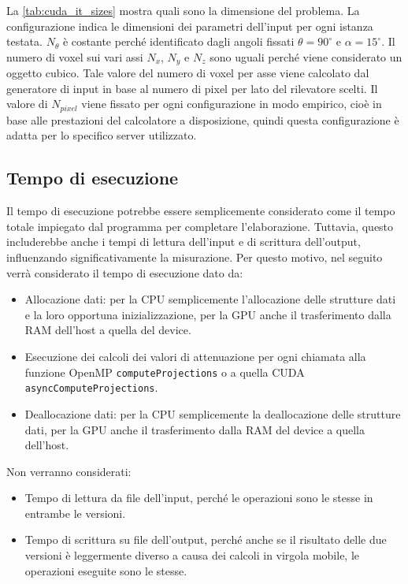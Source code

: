 \documentclass[12pt,a4paper]{report}
\begin{document}
La \autoref{tab:cuda_it_sizes} mostra quali sono la dimensione del problema.
La configurazione indica le dimensioni dei parametri dell'input per ogni istanza testata.
\(N_\theta\) è costante perché identificato dagli angoli fissati \(\theta = 90^\circ\) e \(\alpha = 15^\circ\).
Il numero di voxel sui vari assi \(N_x\), \(N_y\) e \(N_z\) sono uguali perché viene considerato un oggetto cubico.
Tale valore del numero di voxel per asse viene calcolato dal generatore di input in base al numero di pixel per lato del
rilevatore scelti.
Il valore di \(N_{pixel}\) viene fissato per ogni configurazione in modo empirico, cioè in base alle prestazioni del calcolatore
a disposizione, quindi questa configurazione è adatta per lo specifico server utilizzato.

\subsection{Tempo di esecuzione}

Il tempo di esecuzione potrebbe essere semplicemente considerato come il tempo totale impiegato dal programma per completare
l'elaborazione.
Tuttavia, questo includerebbe anche i tempi di lettura dell'input e di scrittura dell'output, influenzando significativamente la
misurazione.
Per questo motivo, nel seguito verrà considerato il tempo di esecuzione dato da:
\begin{itemize}
  \item Allocazione dati: per la CPU semplicemente l'allocazione delle strutture dati e la loro opportuna inizializzazione, per la
        GPU anche il trasferimento dalla RAM dell'host a quella del device.
  \item Esecuzione dei calcoli dei valori di attenuazione per ogni chiamata alla funzione OpenMP \lstinline{computeProjections} o
        a quella CUDA \mbox{\lstinline{asyncComputeProjections}.}
  \item Deallocazione dati: per la CPU semplicemente la deallocazione delle strutture dati, per la GPU anche il trasferimento
        dalla RAM del device a quella dell'host.
\end{itemize}
Non verranno considerati:
\begin{itemize}
  \item Tempo di lettura da file dell'input, perché le operazioni sono le stesse in entrambe le versioni.
  \item Tempo di scrittura su file dell'output, perché anche se il risultato delle due versioni è leggermente diverso a causa dei
        calcoli in virgola mobile, le operazioni eseguite sono le stesse.
\end{itemize}
\end{document}
